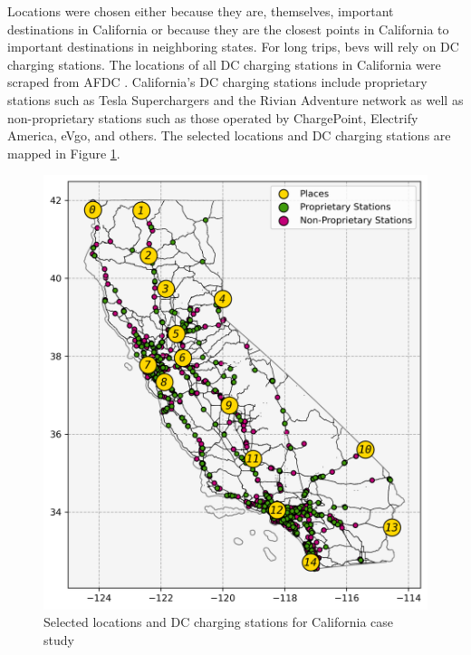 \documentclass[11pt]{article}
\begin{document}
\begin{multicols}{2}
Locations were chosen either because they are, themselves, important destinations in California or because they are the closest points in California to important destinations in neighboring states. For long trips, \glspl{bev} will rely on DC charging stations. The locations of all DC charging stations in California were scraped from AFDC \cite{afdc_2023}. California's DC charging stations include proprietary stations such as Tesla Superchargers and the Rivian Adventure network as well as non-proprietary stations such as those operated by ChargePoint, Electrify America, eVgo, and others. The selected locations and DC charging stations are mapped in Figure \ref{fig:california_atlas}.

\begin{figure}[H]
	\centering
	\includegraphics[width = \linewidth]{figs/California_Places_Chargers.png}
	\caption{Selected locations and DC charging stations for California case study}
	\label{fig:california_atlas}
\end{figure}


\end{multicols}
\end{document}
